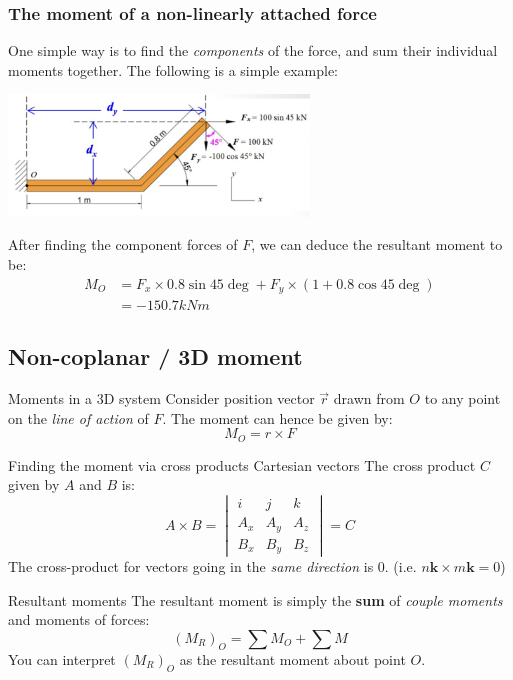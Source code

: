 \documentclass{article}
\begin{document}
\subsubsection{The moment of a non-linearly attached force}
One simple way is to find the \emph{components} of the force, and sum their individual moments together. The following is a simple example:
\begin{center}
    \includegraphics[width=8cm]{img/Moment1.jpg}

    After finding the component forces of $F$, we can deduce the resultant moment to be:
    \begin{align*}
        M_O & =F_x\times 0.8\sin 45\deg+F_y\times(1+0.8\cos 45\deg) \\
            & =-150.7kNm
    \end{align*}
\end{center}

\subsection{Non-coplanar / 3D moment}
\begin{definition}
    {Moments in a 3D system}
    Consider position vector $\vec{r}$ drawn from $O$ to any point on the \emph{line of action} of $F$. The moment can hence be given by:
    \[M_O=r\times F\]
\end{definition}
\begin{definition}
    {Finding the moment via cross products Cartesian vectors}
    The cross product $C$ given by $A$ and $B$ is:
    \[A\times B=\begin{vmatrix}
            i   & j   & k   \\
            A_x & A_y & A_z \\
            B_x & B_y & B_z
        \end{vmatrix}=C\]
    The cross-product for vectors going in the \emph{same direction} is 0. (i.e. $n\boldsymbol{k}\times m\boldsymbol{k}=0$)
\end{definition}
\begin{knBox}
    {Resultant moments}
    The resultant moment is simply the \textbf{sum} of \emph{couple moments} and moments of forces:
    \[(M_R)_O=\sum M_O + \sum M\]
    You can interpret $(M_R)_O$ as the resultant moment about point $O$.
\end{knBox}
\end{document}
